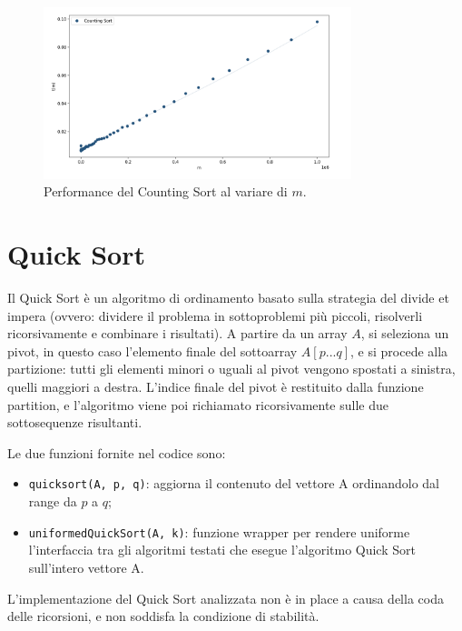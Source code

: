 \documentclass[a4paper, 12pt, oneside]{book}
\begin{document}
\begin{figure}[H]
    \centering
    \includegraphics[width=0.8\textwidth]{images/grafico_counting_sort_m.png}
    \caption{Performance del Counting Sort al variare di \(m\).}
    \label{fig:counting_sort_m}
\end{figure}


\chapter{Quick Sort}\label{chap:Quick Sort} %

Il Quick Sort è un algoritmo di ordinamento basato sulla strategia del divide et impera (ovvero: dividere il problema in sottoproblemi più piccoli, risolverli ricorsivamente e combinare i risultati).
A partire da un array \(A\), si seleziona un pivot, in questo caso l'elemento finale del sottoarray \(A[p...q]\), e si procede alla partizione: tutti gli elementi minori o uguali al pivot vengono spostati a sinistra, quelli maggiori a destra. L'indice finale del pivot è restituito dalla funzione partition, e l'algoritmo viene poi richiamato ricorsivamente sulle due sottosequenze risultanti.


\noindent Le due funzioni fornite nel codice sono:

\begin{itemize}
    \item \texttt{quicksort(A, p, q)}: aggiorna il contenuto del vettore A ordinandolo dal range da $p$ a $q$;
    \item \texttt{uniformedQuickSort(A, k)}: funzione wrapper per rendere uniforme l'interfaccia tra gli algoritmi testati che esegue l'algoritmo Quick Sort sull'intero vettore A.
\end{itemize}

\noindent
L'implementazione del Quick Sort analizzata non è in place a causa della coda delle ricorsioni, e non soddisfa la condizione di stabilità.
\end{document}
